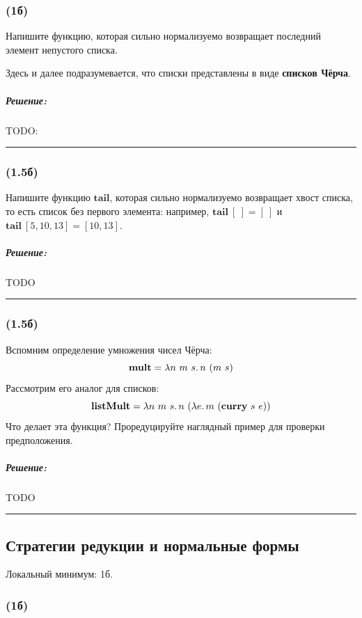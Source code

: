 \documentclass{article}
\newenvironment{proof}{\subparagraph{\hspace{-1em}Решение:\newline}}{\par\noindent\rule{\textwidth}{0.4pt}}
\newcommand{\term}[1]{\mathbf{#1}}
\begin{document}
    \subsubsection{(1б)}

    Напишите функцию, которая сильно нормализуемо возвращает последний элемент непустого списка.

    Здесь и далее подразумевается, что списки представлены в виде \textbf{списков Чёрча}.

    \begin{proof}
        TODO: %
    \end{proof}

    \subsubsection{(1.5б)}

    Напишите функцию $\term{tail}$, которая сильно нормализуемо возвращает хвост списка, то есть список без первого элемента: например, $\term{tail}~[~] = [~]$ и $\term{tail}~[5,10,13] = [10, 13]$.

    \begin{proof}
        TODO %
    \end{proof}

    \subsubsection{(1.5б)}

    Вспомним определение умножения чисел Чёрча:
    \[\term{mult} = \lambda n~m~s\ldotp n~(m~s)\]
    Рассмотрим его аналог для списков:
    \[\term{listMult} = \lambda n~m~s\ldotp n~(\lambda e\ldotp m~(\term{curry}~s~e))\]
    Что делает эта функция?
    Проредуцируйте наглядный пример для проверки предположения.

    \begin{proof}
        TODO %
    \end{proof}

    \subsection{Стратегии редукции и нормальные формы}

    Локальный минимум: 1б.

    \subsubsection{(1б)}
\end{document}
